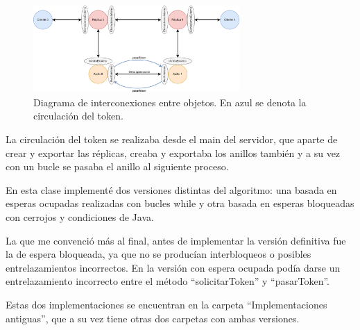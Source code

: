 \documentclass{article}
\begin{document}
\begin{figure}[H]
    \centering
    \includegraphics[width=0.7\textwidth]{imagenes/diagramaAnillosSeparados.png}
    \caption{Diagrama de interconexiones entre objetos. En azul se denota la circulación del token.}
\end{figure}

La circulación del token se realizaba desde el main del servidor, que aparte de crear y exportar las réplicas, creaba y exportaba los anillos también y a su vez con un bucle se pasaba el anillo al siguiente proceso.

En esta clase implementé dos versiones distintas del algoritmo: una basada en esperas ocupadas realizadas con bucles while y otra basada en esperas bloqueadas con cerrojos y condiciones de Java.

La que me convenció más al final, antes de implementar la versión definitiva fue la de espera bloqueada, ya que no se producían interbloqueos o posibles entrelazamientos incorrectos. En la versión con espera ocupada podía darse un entrelazamiento incorrecto entre el método ``solicitarToken'' y ``pasarToken''.

Estas dos implementaciones se encuentran en la carpeta ``Implementaciones antiguas'', que a su vez tiene otras dos carpetas con ambas versiones.
\end{document}
